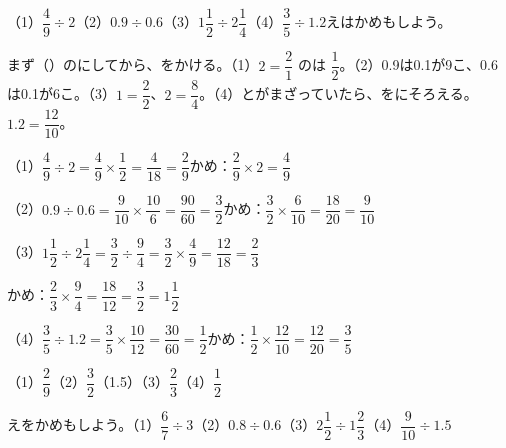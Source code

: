 \begin{reidai}
（1）\nobreak $\dfrac{4}{9}\div2$\quad（2）\nobreak $0.9\div0.6$\quad（3）\nobreak $1\dfrac{1}{2}\div2\dfrac{1}{4}$\quad（4）\nobreak $\dfrac{3}{5}\div1.2$\quad {}えはかめもしよう。\par
\kangaekata まず（）のにしてから、をかける。（1）$2=\dfrac{2}{1}$ のは $\dfrac{1}{2}$。（2）0.9は0.1が9こ、0.6は0.1が6こ。（3）$1=\dfrac{2}{2}$、$2=\dfrac{8}{4}$。（4）とがまざっていたら、をにそろえる。$1.2=\dfrac{12}{10}$。\par
\shiki （1）\nobreak $\dfrac{4}{9}\div2=\dfrac{4}{9}\times\dfrac{1}{2}=\dfrac{4}{18}=\dfrac{2}{9}$\quad {}かめ：$\dfrac{2}{9}\times2=\dfrac{4}{9}$\par
\hspace*{2.6\zw}（2）\nobreak $0.9\div0.6=\dfrac{9}{10}\times\dfrac{10}{6}=\dfrac{90}{60}=\dfrac{3}{2}$\quad {}かめ：$\dfrac{3}{2}\times\dfrac{6}{10}=\dfrac{18}{20}=\dfrac{9}{10}$\par
\hspace*{2.6\zw}（3）\nobreak $1\dfrac{1}{2}\div2\dfrac{1}{4}=\dfrac{3}{2}\div\dfrac{9}{4}=\dfrac{3}{2}\times\dfrac{4}{9}=\dfrac{12}{18}=\dfrac{2}{3}$\par
\hspace*{2.6\zw}\phantom{（3）}かめ：$\dfrac{2}{3}\times\dfrac{9}{4}=\dfrac{18}{12}=\dfrac{3}{2}=1\dfrac{1}{2}$\par
\hspace*{2.6\zw}（4）\nobreak $\dfrac{3}{5}\div1.2=\dfrac{3}{5}\times\dfrac{10}{12}=\dfrac{30}{60}=\dfrac{1}{2}$\quad {}かめ：$\dfrac{1}{2}\times\dfrac{12}{10}=\dfrac{12}{20}=\dfrac{3}{5}$\par
\kotae （1）\nobreak $\dfrac{2}{9}$\quad（2）\nobreak $\dfrac{3}{2}$（1.5）\quad（3）\nobreak $\dfrac{2}{3}$\quad（4）\nobreak $\dfrac{1}{2}$
\end{reidai}

\begin{jibun}
えをかめもしよう。\quad（1）\nobreak $\dfrac{6}{7}\div3$\quad（2）\nobreak $0.8\div0.6$\quad（3）\nobreak $2\dfrac{1}{2}\div1\dfrac{2}{3}$\quad（4）\nobreak $\dfrac{9}{10}\div1.5$
\end{jibun}

